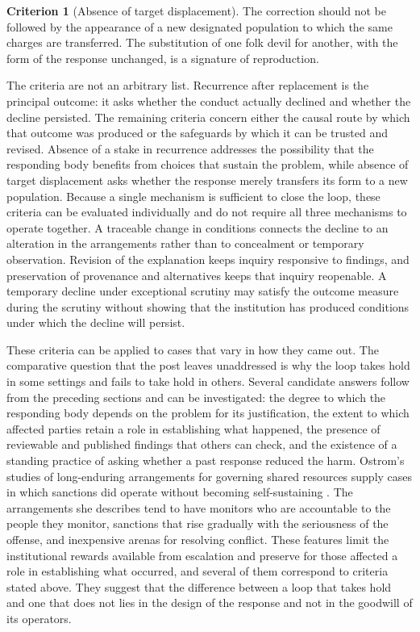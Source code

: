 \documentclass[11pt]{article}
\theoremstyle{definition}
\newtheorem{criterion}{Criterion}
\begin{document}
\begin{criterion}[Absence of target displacement]
The correction should not be followed by the appearance of a new designated population to which the same charges are transferred. The substitution of one folk devil for another, with the form of the response unchanged, is a signature of reproduction.
\end{criterion}

The criteria are not an arbitrary list. Recurrence after replacement is the principal outcome: it asks whether the conduct actually declined and whether the decline persisted. The remaining criteria concern either the causal route by which that outcome was produced or the safeguards by which it can be trusted and revised. Absence of a stake in recurrence addresses the possibility that the responding body benefits from choices that sustain the problem, while absence of target displacement asks whether the response merely transfers its form to a new population. Because a single mechanism is sufficient to close the loop, these criteria can be evaluated individually and do not require all three mechanisms to operate together. A traceable change in conditions connects the decline to an alteration in the arrangements rather than to concealment or temporary observation. Revision of the explanation keeps inquiry responsive to findings, and preservation of provenance and alternatives keeps that inquiry reopenable. A temporary decline under exceptional scrutiny may satisfy the outcome measure during the scrutiny without showing that the institution has produced conditions under which the decline will persist.

These criteria can be applied to cases that vary in how they came out. The comparative question that the post leaves unaddressed is why the loop takes hold in some settings and fails to take hold in others. Several candidate answers follow from the preceding sections and can be investigated: the degree to which the responding body depends on the problem for its justification, the extent to which affected parties retain a role in establishing what happened, the presence of reviewable and published findings that others can check, and the existence of a standing practice of asking whether a past response reduced the harm. Ostrom's studies of long-enduring arrangements for governing shared resources supply cases in which sanctions did operate without becoming self-sustaining \cite{ostrom1990}. The arrangements she describes tend to have monitors who are accountable to the people they monitor, sanctions that rise gradually with the seriousness of the offense, and inexpensive arenas for resolving conflict. These features limit the institutional rewards available from escalation and preserve for those affected a role in establishing what occurred, and several of them correspond to criteria stated above. They suggest that the difference between a loop that takes hold and one that does not lies in the design of the response and not in the goodwill of its operators.
\end{document}
